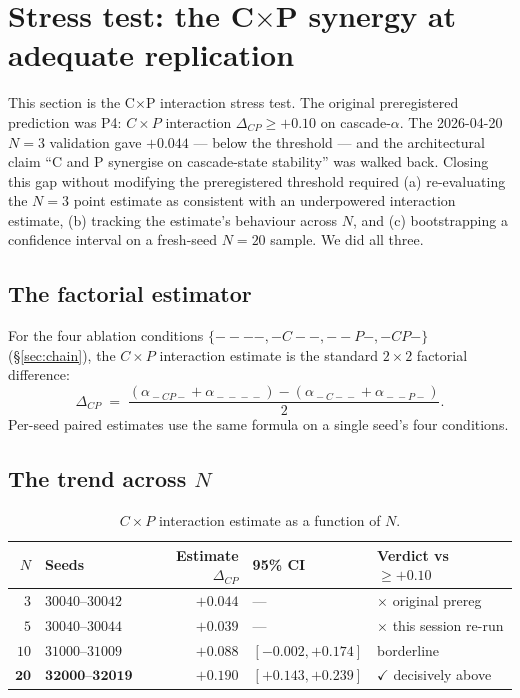 \section{Stress test: the C\texorpdfstring{$\times$}{x}P synergy at adequate
         replication}\label{sec:stress}

This section is the C$\times$P interaction stress test. The original
preregistered prediction was P4: $C\times P$ interaction
$\Delta_{CP} \geq +0.10$ on cascade-$\alpha$. The 2026-04-20
$N\!=\!3$ validation gave $+0.044$ — below the threshold — and the
architectural claim ``C and P synergise on cascade-state stability''
was walked back. Closing this gap without modifying the preregistered
threshold required (a) re-evaluating the $N\!=\!3$ point estimate as
consistent with an underpowered interaction estimate, (b) tracking
the estimate's behaviour across $N$, and (c) bootstrapping a
confidence interval on a fresh-seed $N\!=\!20$ sample. We did all
three.

\subsection{The factorial estimator}

For the four ablation conditions $\{----, -C--, --P-, -CP-\}$
(\S\ref{sec:chain}), the $C\times P$ interaction estimate is the
standard $2\times 2$ factorial difference:
\[
\Delta_{CP}
\;=\;\frac{(\alpha_{\!-CP\!-}+\alpha_{\!-\!-\!-\!-})
        - (\alpha_{\!-C\!-\!-}+\alpha_{\!-\!-P\!-})}{2}.
\]
Per-seed paired estimates use the same formula on a single seed's
four conditions.

\subsection{The trend across \texorpdfstring{$N$}{N}}

\begin{table}[ht]
\centering
\small
\caption{$C\times P$ interaction estimate as a function of $N$.}
\label{tab:cxp_trend}
\begin{tabular}{r l r l l}
\toprule
$N$ & Seeds & Estimate $\Delta_{CP}$ & 95\% CI & Verdict vs $\geq +0.10$ \\
\midrule
$3$  & $30040$--$30042$ & $+0.044$ & --- & $\times$ original prereg \\
$5$  & $30040$--$30044$ & $+0.039$ & --- & $\times$ this session re-run \\
$10$ & $31000$--$31009$ & $+0.088$ & $[-0.002, +0.174]$ & borderline \\
$\mathbf{20}$ & $\mathbf{32000\text{--}32019}$ & $\mathbf{+0.190}$
       & $\mathbf{[+0.143, +0.239]}$ & $\checkmark$ decisively above \\
\bottomrule
\end{tabular}
\end{table}

